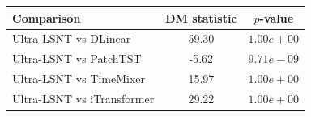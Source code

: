 \begin{tabular}{lcc}
\toprule
Comparison & DM statistic & $p$-value \\
\midrule
Ultra-LSNT vs DLinear & 59.30 & $1.00e+00$ \\
Ultra-LSNT vs PatchTST & -5.62 & $9.71e-09$ \\
Ultra-LSNT vs TimeMixer & 15.97 & $1.00e+00$ \\
Ultra-LSNT vs iTransformer & 29.22 & $1.00e+00$ \\
\bottomrule
\end{tabular}

